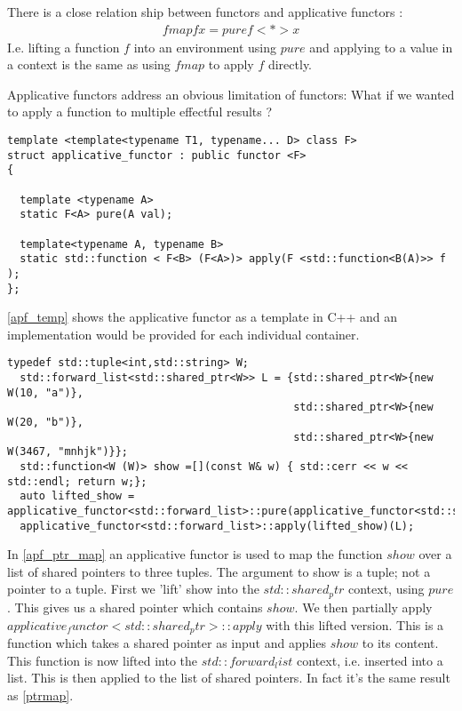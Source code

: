 \documentclass[12pt,fleqn]{article}
\begin{document}
There is a close relation ship between functors and applicative functors :
\begin{eqnarray*}
  fmap f x = pure f <*> x
\end{eqnarray*} 
I.e. lifting a function $f$ into an environment using $pure$ and applying to a value in a context is the same as using $fmap$ to apply $f$ directly.

Applicative functors address an obvious limitation of functors: What if we wanted to apply a function to multiple effectful results ?

\begin{lstlisting}[caption=applicative functor template in C++, label=apf_temp]
template <template<typename T1, typename... D> class F> 
struct applicative_functor : public functor <F>
{

  template <typename A> 
  static F<A> pure(A val);

  template<typename A, typename B>
  static std::function < F<B> (F<A>)> apply(F <std::function<B(A)>> f );
};
\end{lstlisting}

\ref{apf_temp} shows the applicative functor as a template in C++ and an implementation would be provided for each individual container.


\begin{lstlisting}[caption=using an applicative functor to map over a list of shared pointers , label=apf_ptr_map]
typedef std::tuple<int,std::string> W;
  std::forward_list<std::shared_ptr<W>> L = {std::shared_ptr<W>{new W(10, "a")}, 
                                             std::shared_ptr<W>{new W(20, "b")}, 
                                             std::shared_ptr<W>{new W(3467, "mnhjk")}};
  std::function<W (W)> show =[](const W& w) { std::cerr << w << std::endl; return w;};
  auto lifted_show = applicative_functor<std::forward_list>::pure(applicative_functor<std::shared_ptr>::apply(applicative_functor<std::shared_ptr>::pure(show)));
  applicative_functor<std::forward_list>::apply(lifted_show)(L);
\end{lstlisting}

In \ref{apf_ptr_map} an applicative functor is used to map the function $show$ over a list of shared pointers to three tuples.
The argument to show is a tuple; not a pointer to a tuple.
First we 'lift' show into the $std::shared_ptr$ context, using $pure$.
This gives us a shared pointer which contains $show$.
We then partially apply $applicative_functor<std::shared_ptr>::apply$ with this lifted version.
This is a function which takes a shared pointer as input and applies $show$ to its content.
This function is now lifted into the $std::forward_list$ context, i.e. inserted into a list.
This is then applied to the list of shared pointers.
In fact it's the same result as \ref{ptrmap}.
\end{document}
